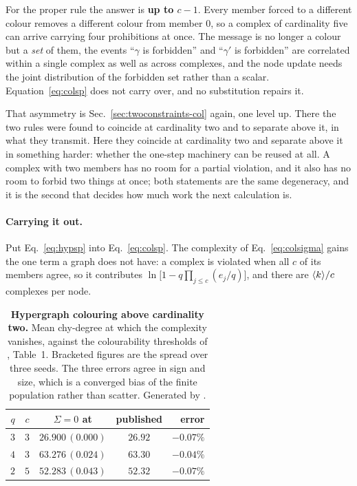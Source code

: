 For the proper rule the answer is \textbf{up to $c-1$}. Every member forced to a
different colour removes a different colour from member $0$, so a complex of
cardinality five can arrive carrying four prohibitions at once. The message is
no longer a colour but a \emph{set} of them, the events ``$\gamma$ is
forbidden'' and ``$\gamma'$ is forbidden'' are correlated within a single
complex as well as across complexes, and the node update needs the joint
distribution of the forbidden set rather than a scalar. Equation~\eqref{eq:colsp}
does not carry over, and no substitution repairs it.

That asymmetry is Sec.~\ref{sec:twoconstraints-col} again, one level up. There
the two rules were found to coincide at cardinality two and to separate above
it, in what they transmit. Here they coincide at cardinality two and separate
above it in something harder: whether the one-step machinery can be reused at
all. A complex with two members has no room for a partial violation, and it also
has no room to forbid two things at once; both statements are the same
degeneracy, and it is the second that decides how much work the next calculation
is.

\paragraph{Carrying it out.} Put Eq.~\eqref{eq:hypsp} into
Eq.~\eqref{eq:colsp}. The complexity of Eq.~\eqref{eq:colsigma} gains the one
term a graph does not have: a complex is violated when all $c$ of its members
agree, so it contributes
$\ln\bigl[1-q\prod_{j\le c}(e_{j}/q)\bigr]$, and there are
$\langle k \rangle/c$ complexes per node.

\begin{table}[t]
\centering\small
\begin{tabular}{ccccr}
\hline\hline
$q$ & $c$ & $\Sigma=0$ at & published & error\\
\hline
$3$ & $3$ & $26.900\,(0.000)$ & $26.92$ & $-0.07\%$\\
$4$ & $3$ & $63.276\,(0.024)$ & $63.30$ & $-0.04\%$\\
$2$ & $5$ & $52.283\,(0.043)$ & $52.32$ & $-0.07\%$\\
\hline\hline
\end{tabular}
\caption{\textbf{Hypergraph colouring above cardinality two.} Mean chy-degree at
which the complexity vanishes, against the colourability thresholds of
\citet{gabrie2017}, Table~1. Bracketed figures are the spread over three
seeds. The three errors agree in sign and size, which is a converged bias of the
finite population rather than scatter. Generated by .}
\label{tab:hypsp}
\end{table}

